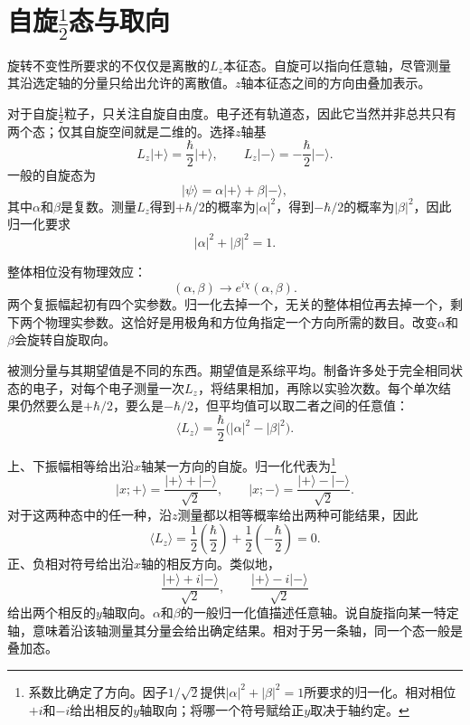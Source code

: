 \section{自旋\texorpdfstring{\(\tfrac12\)}{1/2}态与取向}

旋转不变性所要求的不仅仅是离散的\(L_z\)本征态。自旋可以指向任意轴，尽管测量其沿选定轴的分量只给出允许的离散值。\(z\)轴本征态之间的方向由叠加表示。

对于自旋\(\tfrac12\)粒子，只关注自旋自由度。电子还有轨道态，因此它当然并非总共只有两个态；仅其自旋空间就是二维的。选择\(z\)轴基
\begin{equation}
L_z\lvert+\rangle=\frac{\hbar}{2}\lvert+\rangle,
\qquad
L_z\lvert-\rangle=-\frac{\hbar}{2}\lvert-\rangle.
\end{equation}
一般的自旋态为
\begin{equation}
\lvert\psi\rangle
=
\alpha\lvert+\rangle+\beta\lvert-\rangle,
\end{equation}
其中\(\alpha\)和\(\beta\)是复数。测量\(L_z\)得到\(+\hbar/2\)的概率为\(|\alpha|^2\)，得到\(-\hbar/2\)的概率为\(|\beta|^2\)，因此归一化要求
\begin{equation}
|\alpha|^2+|\beta|^2=1.
\end{equation}

整体相位没有物理效应：
\begin{equation}
(\alpha,\beta)\longrightarrow
e^{i\chi}(\alpha,\beta).
\end{equation}
两个复振幅起初有四个实参数。归一化去掉一个，无关的整体相位再去掉一个，剩下两个物理实参数。这恰好是用极角和方位角指定一个方向所需的数目。改变\(\alpha\)和\(\beta\)会旋转自旋取向。

被测分量与其期望值是不同的东西。期望值是系综平均。制备许多处于完全相同状态的电子，对每个电子测量一次\(L_z\)，将结果相加，再除以实验次数。每个单次结果仍然要么是\(+\hbar/2\)，要么是\(-\hbar/2\)，但平均值可以取二者之间的任意值：
\begin{equation}
\langle L_z\rangle
=
\frac{\hbar}{2}\bigl(|\alpha|^2-|\beta|^2\bigr).
\end{equation}

上、下振幅相等给出沿\(x\)轴某一方向的自旋。归一化代表为\footnote{系数比确定了方向。因子\(1/\sqrt2\)提供\( |\alpha|^2+|\beta|^2=1\)所要求的归一化。相对相位\(+i\)和\(-i\)给出相反的\(y\)轴取向；将哪一个符号赋给正\(y\)取决于轴约定。}
\begin{equation}
\lvert x;+\rangle
=
\frac{\lvert+\rangle+\lvert-\rangle}{\sqrt2},
\qquad
\lvert x;-\rangle
=
\frac{\lvert+\rangle-\lvert-\rangle}{\sqrt2}.
\end{equation}
对于这两种态中的任一种，沿\(z\)测量都以相等概率给出两种可能结果，因此
\begin{equation}
\langle L_z\rangle
=
\frac12\left(\frac{\hbar}{2}\right)
+
\frac12\left(-\frac{\hbar}{2}\right)
=0.
\end{equation}
正、负相对符号给出沿\(x\)轴的相反方向。类似地，
\begin{equation}
\frac{\lvert+\rangle+i\lvert-\rangle}{\sqrt2},
\qquad
\frac{\lvert+\rangle-i\lvert-\rangle}{\sqrt2}
\end{equation}
给出两个相反的\(y\)轴取向。\(\alpha\)和\(\beta\)的一般归一化值描述任意轴。说自旋指向某一特定轴，意味着沿该轴测量其分量会给出确定结果。相对于另一条轴，同一个态一般是叠加态。

